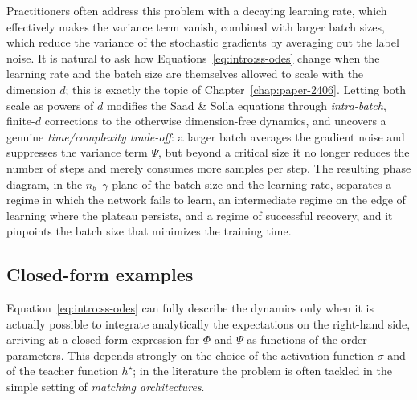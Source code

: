 Practitioners often address this problem with a decaying learning rate, which effectively makes the variance term vanish, combined with larger batch sizes, which reduce the variance of the stochastic gradients by averaging out the label noise.
It is natural to ask how Equations~\eqref{eq:intro:ss-odes} change when the learning rate and the batch size are themselves allowed to scale with the dimension \(d\); this is exactly the topic of Chapter~\ref{chap:paper-2406}. Letting both scale as powers of \(d\) modifies the Saad \& Solla equations through \emph{intra-batch}, finite-\(d\) corrections to the otherwise dimension-free dynamics, and uncovers a genuine \emph{time/complexity trade-off}: a larger batch averages the gradient noise and suppresses the variance term \(\Psi\), but beyond a critical size it no longer reduces the number of steps and merely consumes more samples per step. The resulting phase diagram, in the \(n_b\)--\(\gamma\) plane of the batch size and the learning rate, separates a regime in which the network fails to learn, an intermediate regime on the edge of learning where the plateau persists, and a regime of successful recovery, and it pinpoints the batch size that minimizes the training time.

\subsection{Closed-form examples}
Equation~\eqref{eq:intro:ss-odes} can fully describe the dynamics only when it is actually possible to integrate analytically the expectations on the right-hand side, arriving at a closed-form expression for \(\Phi\) and \(\Psi\) as functions of the order parameters. This depends strongly on the choice of the activation function \(\sigma\) and of the teacher function \(h^\star\); in the literature the problem is often tackled in the simple setting of \emph{matching architectures}.

